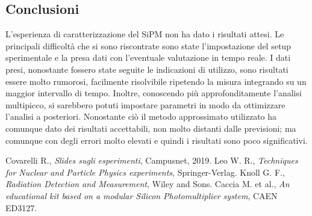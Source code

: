 \documentclass[11pt]{article} %
\begin{document}
\subsection*{Conclusioni}
L'esperienza di caratterizzazione del SiPM non ha dato i risultati attesi. Le principali difficoltà che si sono riscontrate sono state l'impostazione del setup sperimentale e la presa dati con l'eventuale valutazione in tempo reale. I dati presi, nonostante fossero state seguite le indicazioni di utilizzo, sono risultati essere molto rumorosi, facilmente risolvibile ripetendo la misura integrando su un maggior intervallo di tempo. Inoltre, conoscendo più approfonditamente l'analisi multipicco, si sarebbero potuti impostare parametri in modo da ottimizzare l'analisi a posteriori. Nonostante ciò il metodo approssimato utilizzato ha comunque dato dei risultati accettabili, non molto distanti dalle previsioni; ma comunque con degli errori molto elevati e quindi i risultati sono poco significativi.
\begin{center}
\adfopenflourishleft\quad{}\quad\adfopenflourishright
\end{center}
\begin{thebibliography}{}
 Covarelli R., \emph{Slides sugli esperimenti}, Campusnet, 2019.
 Leo W. R., \emph{Techniques for Nuclear and Particle Physics experiments}, Springer-Verlag.
 Knoll G. F., \emph{Radiation Detection and Measurement}, Wiley and Sons.
 Caccia M. et al., \emph{An educational kit based on a modular Silicon Photomultiplier system}, CAEN ED3127.
\end{thebibliography}
\end{document}
